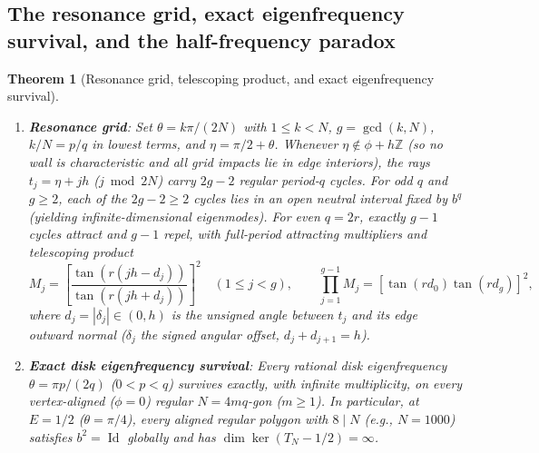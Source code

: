 \documentclass[11pt,reqno]{amsart}
\newtheorem{theorem}{Theorem}[section]
\theoremstyle{definition}
\theoremstyle{remark}
\newcommand{\Z}{\mathbb{Z}}
\DeclareMathOperator{\Id}{Id}
\begin{document}
\subsection{The resonance grid, exact eigenfrequency survival, and the half-frequency paradox}

\begin{theorem}[Resonance grid, telescoping product, and exact eigenfrequency survival]\label{thm:res-grid}
\leavevmode
\begin{enumerate}
  \item \textbf{Resonance grid}: Set $\theta = k\pi/(2N)$ with $1 \le k < N$, $g = \gcd(k, N)$, $k/N = p/q$ in lowest terms, and $\eta = \pi/2 + \theta$. Whenever $\eta \notin \phi + h\Z$ (so no wall is characteristic and all grid impacts lie in edge interiors), the rays $t_j = \eta + jh$ ($j \bmod 2N$) carry $2g - 2$ regular period-$q$ cycles. For odd $q$ and $g \ge 2$, each of the $2g - 2 \ge 2$ cycles lies in an open neutral interval fixed by $b^q$ (yielding infinite-dimensional eigenmodes). For even $q = 2r$, exactly $g - 1$ cycles attract and $g - 1$ repel, with full-period attracting multipliers and telescoping product
  \begin{equation}\label{eq:grid-mult}
    M_j = \left[\frac{\tan(r(jh - d_j))}{\tan(r(jh + d_j))}\right]^2 \quad (1 \le j < g), \qquad
    \prod_{j=1}^{g-1} M_j = [\tan(r d_0)\tan(r d_g)]^2,
  \end{equation}
  where $d_j = |\delta_j| \in (0, h)$ is the unsigned angle between $t_j$ and its edge outward normal ($\delta_j$ the signed angular offset, $d_j + d_{j+1} = h$).
  \item \textbf{Exact disk eigenfrequency survival}: Every rational disk eigenfrequency $\theta = \pi p/(2q)$ ($0 < p < q$) survives \emph{exactly}, with infinite multiplicity, on every vertex-aligned ($\phi = 0$) regular $N = 4mq$-gon ($m \ge 1$). In particular, at $E = 1/2$ ($\theta = \pi/4$), every aligned regular polygon with $8 \mid N$ (e.g., $N = 1000$) satisfies $b^2 = \Id$ globally and has $\dim \ker(T_N - 1/2) = \infty$.
\end{enumerate}
\end{theorem}
\end{document}
